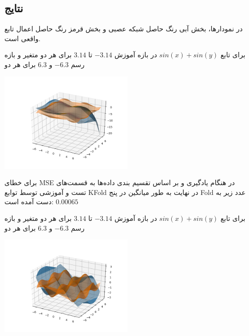 \documentclass[12pt,titlepage,a4page , tikz , multi,table , svgnames,xcdraw]{article}
\begin{document}
\newpage

\subsection{نتایج}

در نمودارها، بخش آبی رنگ حاصل شبکه عصبی و بخش قرمز رنگ حاصل اعمال تابع واقعی است.



برای تابع $sin(x) + sin(y)$ در بازه آموزش $-3.14$ تا $3.14$ برای هر دو متغیر و بازه رسم $-6.3$ و $6.3$ برای هر دو


\begin{center}

 \includegraphics[width=0.5\textwidth]{pictures/10.png}

\end{center}

برای خطای MSE در هنگام یادگیری و بر اساس تقسیم بندی داده‌ها به قسمت‌های تست و آموزشی توسط توابع KFold در نهایت به طور میانگین در پنج Fold عدد زیر به دست آمده است:
$ 0.00065$


\hrulefill



برای تابع $sin(x) + sin(y)$ در بازه آموزش $-3.14$ تا $3.14$ برای هر دو متغیر و بازه رسم $-6.3$ و $6.3$ برای هر دو


\begin{center}

 \includegraphics[width=0.5\textwidth]{pictures/11.png}

\end{center}
\end{document}

